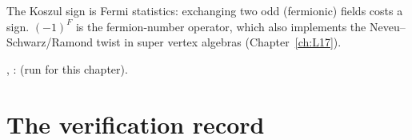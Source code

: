 \begin{physics}
The Koszul sign is Fermi statistics: exchanging two odd (fermionic) fields costs a sign. $(-1)^F$ is the
fermion-number operator, which also implements the Neveu--Schwarz/Ramond twist in super vertex
algebras (Chapter~\ref{ch:L17}).
\end{physics}

\begin{status}
\allowbreak{}, \allowbreak{}\allowbreak{}\allowbreak{}:  (run for this chapter).
\end{status}

\section{The verification record}\label{l02:sec:verification}

